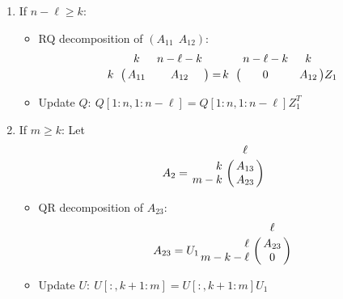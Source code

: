 \begin{enumerate}
\begin{enumerate}[(1)]
                \item If $n-\ell \geq k$:
                    \begin{itemize}
                        \item RQ decomposition of $(A_{11} \ \ A_{12})$:
                            \begin{displaymath}
                                \bordermatrix{ & k & n-\ell-k \cr
                                \hfill k & A_{11} & A_{12} \cr}
                                = \bordermatrix{ & n-\ell-k & k \cr
                                \hfill k & 0 & A_{12} \cr}Z_{1}
                            \end{displaymath}
                        \item Update $Q: \ Q[1:n, 1:n-\ell] = Q[1:n, 1:n-\ell]Z_{1}^{T}$
                    \end{itemize}
                \item If $m \geq k$:
                    Let 
                    \begin{displaymath}
                    A_{2} = \bordermatrix{ & \ell  \cr
                            \hfill k & A_{13}  \cr
                            \hfill m-k & A_{23} \cr}
                    \end{displaymath} 
                    \begin{itemize}
                        \item QR decomposition of $A_{23}$:
                        \begin{displaymath}
                        A_{23} = U_{1}\bordermatrix{ & \ell  \cr
                            \hfill \ell & A_{23}  \cr
                            \hfill m-k-\ell & 0 \cr}
                    \end{displaymath} 
                        \item Update $U: \ U[:,k+1:m] = U[:,k+1:m]U_{1}$
                    \end{itemize}    
            \end{enumerate}
            

\end{enumerate}
